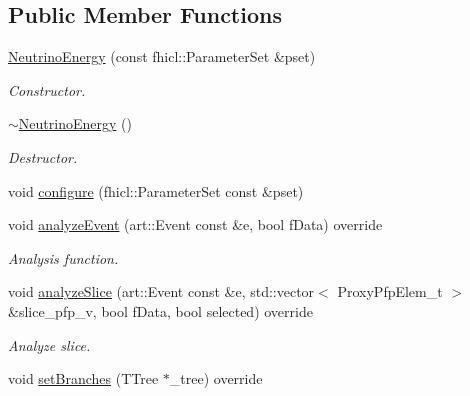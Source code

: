 \subsection*{Public Member Functions}
\begin{DoxyCompactItemize}
\item 
\hyperlink{classanalysis_1_1NeutrinoEnergy_a6a342831715e00279fd5eb8c18c9825c}{Neutrino\+Energy} (const fhicl\+::\+Parameter\+Set \&pset)
\begin{DoxyCompactList}\small\item\em Constructor. \end{DoxyCompactList}\item 
\hyperlink{classanalysis_1_1NeutrinoEnergy_a78f6dd22284932e8dff28bf549a37230}{$\sim$\+Neutrino\+Energy} ()\hypertarget{classanalysis_1_1NeutrinoEnergy_a78f6dd22284932e8dff28bf549a37230}{}\label{classanalysis_1_1NeutrinoEnergy_a78f6dd22284932e8dff28bf549a37230}

\begin{DoxyCompactList}\small\item\em Destructor. \end{DoxyCompactList}\item 
void \hyperlink{classanalysis_1_1NeutrinoEnergy_a99bb8ff701dd04f1aca1d59be26ee3dd}{configure} (fhicl\+::\+Parameter\+Set const \&pset)
\item 
void \hyperlink{classanalysis_1_1NeutrinoEnergy_aa28c04be4e79d4553e687c936a57fe59}{analyze\+Event} (art\+::\+Event const \&e, bool f\+Data) override\hypertarget{classanalysis_1_1NeutrinoEnergy_aa28c04be4e79d4553e687c936a57fe59}{}\label{classanalysis_1_1NeutrinoEnergy_aa28c04be4e79d4553e687c936a57fe59}

\begin{DoxyCompactList}\small\item\em Analysis function. \end{DoxyCompactList}\item 
void \hyperlink{classanalysis_1_1NeutrinoEnergy_a56b3c293b52d2a69f94d333d42488f8d}{analyze\+Slice} (art\+::\+Event const \&e, std\+::vector$<$ Proxy\+Pfp\+Elem\+\_\+t $>$ \&slice\+\_\+pfp\+\_\+v, bool f\+Data, bool selected) override
\begin{DoxyCompactList}\small\item\em Analyze slice. \end{DoxyCompactList}\item 
void \hyperlink{classanalysis_1_1NeutrinoEnergy_abb0ffb3baf5e18d759f518cc0063b5b4}{set\+Branches} (T\+Tree $\ast$\+\_\+tree) override\hypertarget{classanalysis_1_1NeutrinoEnergy_abb0ffb3baf5e18d759f518cc0063b5b4}{}\label{classanalysis_1_1NeutrinoEnergy_abb0ffb3baf5e18d759f518cc0063b5b4}


\end{DoxyCompactItemize}
